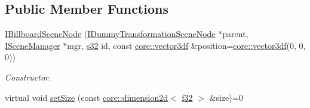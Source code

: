\subsection*{Public Member Functions}
\begin{DoxyCompactItemize}
\item 
\hyperlink{classirr_1_1scene_1_1IBillboardSceneNode_a92d3ac7399c874d59cd26d5dfb36ff63}{I\+Billboard\+Scene\+Node} (\hyperlink{classirr_1_1scene_1_1IDummyTransformationSceneNode}{I\+Dummy\+Transformation\+Scene\+Node} $\ast$parent, \hyperlink{classirr_1_1scene_1_1ISceneManager}{I\+Scene\+Manager} $\ast$mgr, \hyperlink{namespaceirr_ac66849b7a6ed16e30ebede579f9b47c6}{s32} id, const \hyperlink{namespaceirr_1_1core_a06f169d08b5c429f5575acb7edbad811}{core\+::vector3df} \&position=\hyperlink{namespaceirr_1_1core_a06f169d08b5c429f5575acb7edbad811}{core\+::vector3df}(0, 0, 0))\hypertarget{classirr_1_1scene_1_1IBillboardSceneNode_a92d3ac7399c874d59cd26d5dfb36ff63}{}\label{classirr_1_1scene_1_1IBillboardSceneNode_a92d3ac7399c874d59cd26d5dfb36ff63}

\begin{DoxyCompactList}\small\item\em Constructor. \end{DoxyCompactList}\item 
virtual void \hyperlink{classirr_1_1scene_1_1IBillboardSceneNode_a911415ac24440bd3ccfcde102583fd60}{set\+Size} (const \hyperlink{classirr_1_1core_1_1dimension2d}{core\+::dimension2d}$<$ \hyperlink{namespaceirr_a0277be98d67dc26ff93b1a6a1d086b07}{f32} $>$ \&size)=0\hypertarget{classirr_1_1scene_1_1IBillboardSceneNode_a911415ac24440bd3ccfcde102583fd60}{}\label{classirr_1_1scene_1_1IBillboardSceneNode_a911415ac24440bd3ccfcde102583fd60}


\end{DoxyCompactItemize}
